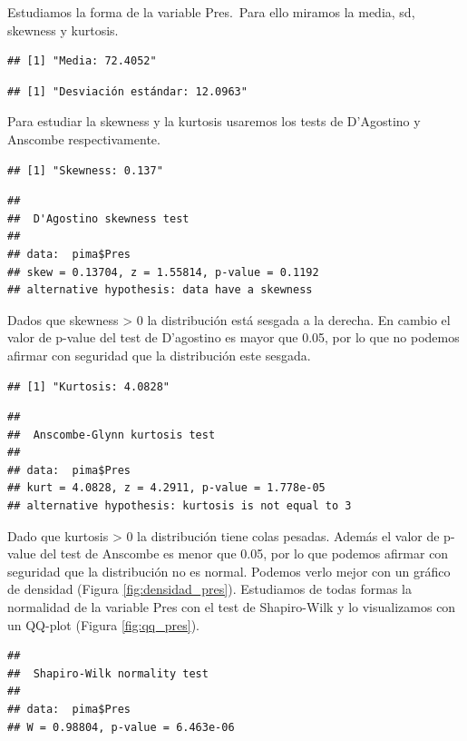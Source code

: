 \documentclass[
]{article}
\begin{document}
Estudiamos la forma de la variable Pres.~Para ello miramos la media, sd,
skewness y kurtosis.

\begin{verbatim}
## [1] "Media: 72.4052"
\end{verbatim}

\begin{verbatim}
## [1] "Desviación estándar: 12.0963"
\end{verbatim}

Para estudiar la skewness y la kurtosis usaremos los tests de D'Agostino
y Anscombe respectivamente.

\begin{verbatim}
## [1] "Skewness: 0.137"
\end{verbatim}

\begin{verbatim}
## 
##  D'Agostino skewness test
## 
## data:  pima$Pres
## skew = 0.13704, z = 1.55814, p-value = 0.1192
## alternative hypothesis: data have a skewness
\end{verbatim}

Dados que skewness \textgreater{} 0 la distribución está sesgada a la
derecha. En cambio el valor de p-value del test de D'agostino es mayor
que 0.05, por lo que no podemos afirmar con seguridad que la
distribución este sesgada.

\begin{verbatim}
## [1] "Kurtosis: 4.0828"
\end{verbatim}

\begin{verbatim}
## 
##  Anscombe-Glynn kurtosis test
## 
## data:  pima$Pres
## kurt = 4.0828, z = 4.2911, p-value = 1.778e-05
## alternative hypothesis: kurtosis is not equal to 3
\end{verbatim}

Dado que kurtosis \textgreater{} 0 la distribución tiene colas pesadas.
Además el valor de p-value del test de Anscombe es menor que 0.05, por
lo que podemos afirmar con seguridad que la distribución no es normal.
Podemos verlo mejor con un gráfico de densidad (Figura
\ref{fig:densidad_pres}). Estudiamos de todas formas la normalidad de la
variable Pres con el test de Shapiro-Wilk y lo visualizamos con un
QQ-plot (Figura \ref{fig:qq_pres}).

\begin{verbatim}
## 
##  Shapiro-Wilk normality test
## 
## data:  pima$Pres
## W = 0.98804, p-value = 6.463e-06
\end{verbatim}
\end{document}

